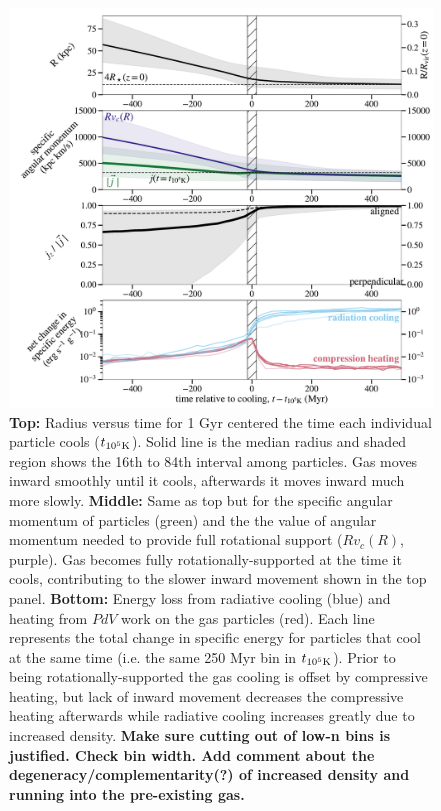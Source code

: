 \documentclass[fleqn,usenatbib]{mnras}
\begin{document}
\begin{figure}
\includegraphics[width=\textwidth]{figures/rad_vs_compress.pdf}
\caption{
\textbf{Top:}
Radius versus time for 1 Gyr centered the time each individual particle cools ($t_{\rm 10^5 K}$).
Solid line is the median radius and shaded region shows the 16th to 84th interval among particles.
Gas moves inward smoothly until it cools, afterwards it moves inward much more slowly.
\textbf{Middle:}
Same as top but for the specific angular momentum of particles (green) and the the value of angular momentum needed to provide full rotational support ($Rv_c(R)$, purple).
Gas becomes fully rotationally-supported at the time it cools, contributing to the slower inward movement shown in the top panel.
\textbf{Bottom:}
Energy loss from radiative cooling (blue) and heating from $PdV$ work on the gas particles (red).
Each line represents the total change in specific energy for particles that cool at the same time (i.e. the same 250 Myr bin in $t_{\rm 10^5 K}$).
Prior to being rotationally-supported the gas cooling is offset by compressive heating, but lack of inward movement decreases the compressive heating afterwards while radiative cooling increases greatly due to increased density.
\textbf{
Make sure cutting out of low-n bins is justified.
Check bin width.
Add comment about the degeneracy/complementarity(?) of increased density and running into the pre-existing gas.
}}
\end{figure}
\end{document}
